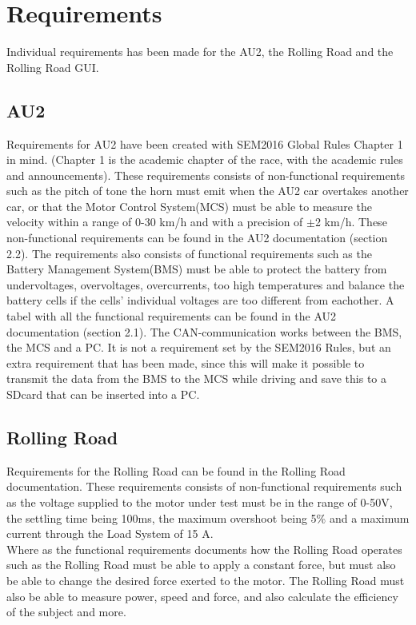 \chapter{Requirements}
Individual requirements has been made for the AU2, the Rolling Road and the Rolling Road GUI.

\section{AU2}
Requirements for AU2 have been created with SEM2016 Global Rules Chapter 1 in mind\cite{ShellRequirements}. (Chapter 1 is the academic chapter of the race, with the academic rules and announcements). These requirements consists of non-functional requirements such as the pitch of tone the horn must emit when the AU2 car overtakes another car, or that the Motor Control System(MCS) must be able to measure the velocity within a range of 0-30 km/h and with a precision of $\pm$2 km/h. These non-functional requirements can be found in the AU2 documentation\cite{AU2} (section 2.2). The requirements also consists of functional requirements such as the Battery Management System(BMS) must be able to protect the battery from undervoltages, overvoltages, overcurrents, too high temperatures and balance the battery cells if the cells' individual voltages are too different from eachother. A tabel with all the functional requirements can be found in the AU2 documentation\cite{AU2} (section 2.1). The CAN-communication works between the BMS, the MCS and a PC. It is not a requirement set by the SEM2016 Rules, but an extra requirement that has been made, since this will make it possible to transmit the data from the BMS to the MCS while driving and save this to a SDcard that can be inserted into a PC.

\section{Rolling Road}
Requirements for the Rolling Road can be found in the Rolling Road documentation\cite{RR}.
These requirements consists of non-functional requirements such as the voltage supplied to the motor under test must be in the range of 0-50V, the settling time being 100ms, the maximum overshoot being 5\% and a maximum current through the Load System of 15 A.\\
Where as the functional requirements documents how the Rolling Road operates such as the Rolling Road must be able to apply a constant force, but must also be able to change the desired force exerted to the motor. The Rolling Road must also be able to measure power, speed and force, and also calculate the efficiency of the subject and more.


